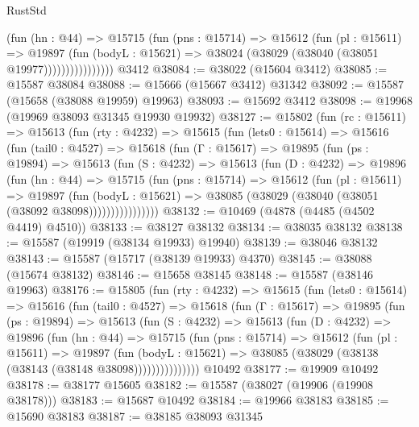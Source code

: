 \begin{lexlean}{RustStd}
\begin{coremodule}
                      (fun (hn : @44) =>
                      @15715
                        (fun (pns : @15714) =>
                        @15612
                          (fun (pl : @15611) =>
                          @19897
                            (fun (bodyL : @15621) =>
                            @38024 (@38029 (@38040 (@38051 @19977))))))))))))))))
    @3412
@38084 := @38022 (@15604 @3412)
@38085 := @15587 @38084
@38088 := @15666 (@15667 @3412) @31342
@38092 := @15587 (@15658 (@38088 @19959) @19963)
@38093 := @15692 @3412
@38098 := @19968 (@19969 @38093 @31345 @19930 @19932)
@38127 := @15802
    (fun (rc : @15611) =>
    @15613
      (fun (rty : @4232) =>
      @15615
        (fun (lets0 : @15614) =>
        @15616
          (fun (tail0 : @4527) =>
          @15618
            (fun (Γ : @15617) =>
            @19895
              (fun (ps : @19894) =>
              @15613
                (fun (S : @4232) =>
                @15613
                  (fun (D : @4232) =>
                  @19896
                    (fun (hn : @44) =>
                    @15715
                      (fun (pns : @15714) =>
                      @15612
                        (fun (pl : @15611) =>
                        @19897
                          (fun (bodyL : @15621) =>
                          @38085 (@38029 (@38040 (@38051 (@38092 @38098))))))))))))))))
@38132 := @10469 (@4878 (@4485 (@4502 @4419) @4510))
@38133 := @38127 @38132
@38134 := @38035 @38132
@38138 := @15587 (@19919 (@38134 @19933) @19940)
@38139 := @38046 @38132
@38143 := @15587 (@15717 (@38139 @19933) @4370)
@38145 := @38088 (@15674 @38132)
@38146 := @15658 @38145
@38148 := @15587 (@38146 @19963)
@38176 := @15805
    (fun (rty : @4232) =>
    @15615
      (fun (lets0 : @15614) =>
      @15616
        (fun (tail0 : @4527) =>
        @15618
          (fun (Γ : @15617) =>
          @19895
            (fun (ps : @19894) =>
            @15613
              (fun (S : @4232) =>
              @15613
                (fun (D : @4232) =>
                @19896
                  (fun (hn : @44) =>
                  @15715
                    (fun (pns : @15714) =>
                    @15612
                      (fun (pl : @15611) =>
                      @19897
                        (fun (bodyL : @15621) =>
                        @38085 (@38029 (@38138 (@38143 (@38148 @38098)))))))))))))))
    @10492
@38177 := @19909 @10492
@38178 := @38177 @15605
@38182 := @15587 (@38027 (@19906 (@19908 @38178)))
@38183 := @15687 @10492
@38184 := @19966 @38183
@38185 := @15690 @38183
@38187 := @38185 @38093 @31345

\end{coremodule}
\end{lexlean}
